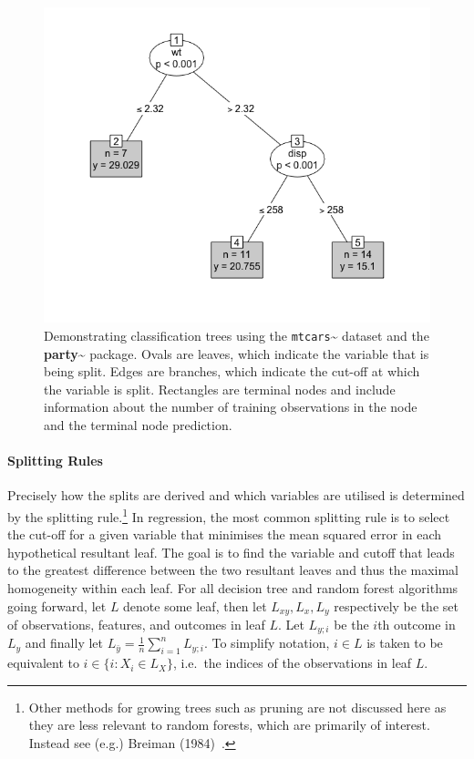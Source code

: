 \documentclass[
  letterpaper,
]{scrbook}
\let\oldparagraph\paragraph
\renewcommand{\paragraph}[1]{\oldparagraph{#1}\mbox{}}
\theoremstyle{plain}
\theoremstyle{definition}
\theoremstyle{remark}
\begin{document}
\begin{figure}

{\centering \includegraphics{./images/forests/iris_tree.png}

}

\caption{\label{fig-surv-ranfor}Demonstrating classification trees using
the \texttt{mtcars}\textasciitilde{}\cite{datamtcars} dataset and the
\textbf{party}\textasciitilde{}\cite{pkgparty} package. Ovals are
leaves, which indicate the variable that is being split. Edges are
branches, which indicate the cut-off at which the variable is split.
Rectangles are terminal nodes and include information about the number
of training observations in the node and the terminal node prediction.}

\end{figure}

\paragraph{Splitting Rules}

Precisely how the splits are derived and which variables are utilised is
determined by the splitting
rule.\footnote{Other methods for growing trees such as pruning are not discussed here as they are less relevant to random forests, which are primarily of interest. Instead see (e.g.) Breiman (1984)~\cite{Breiman1984}.}
In regression, the most common splitting rule is to select the cut-off
for a given variable that minimises the mean squared error in each
hypothetical resultant leaf. The goal is to find the variable and cutoff
that leads to the greatest difference between the two resultant leaves
and thus the maximal homogeneity within each leaf. For all decision tree
and random forest algorithms going forward, let \(L\) denote some leaf,
then let \(L_{xy}, L_x, L_y\) respectively be the set of observations,
features, and outcomes in leaf \(L\). Let \(L_{y;i}\) be the \(i\)th
outcome in \(L_y\) and finally let
\(L_{\bar{y}} = \frac{1}{n} \sum^{n}_{i = 1} L_{y;i}\). To simplify
notation, \(i \in L\) is taken to be equivalent to
\(i \in \{i: X_i \in L_X\}\), i.e.~the indices of the observations in
leaf \(L\).
\end{document}

